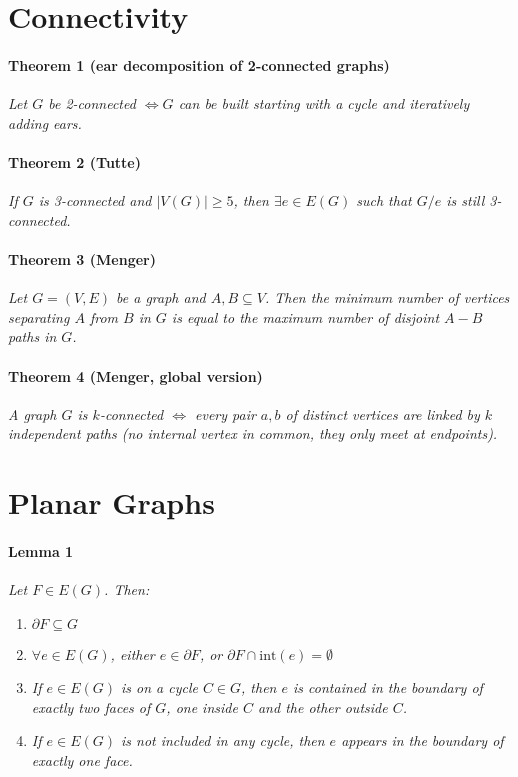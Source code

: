 \documentclass[a4paper,10pt]{article}
\begin{document}
\section{Connectivity}
\paragraph{Theorem 1 (ear decomposition of 2-connected graphs)}
\textit{Let $G$ be 2-connected $\iff G$ can be built starting with a cycle and iteratively adding ears.}

\paragraph{Theorem 2 (Tutte)} 
		\textit{If $G$ is 3-connected and $|V(G)| \geq 5$, then $\exists e \in E (G)$ such that $G / e$ is still 3-connected.}

\paragraph{Theorem 3 (Menger)}
		\textit{Let $G = (V,E)$ be a graph and $A, B \subseteq V$. Then the minimum number of vertices separating $A$ from $B$ in $G$ is equal to the maximum number of disjoint $A-B$ paths in $G$.}
		
\paragraph{Theorem 4 (Menger, global version)} \textit{A graph $G$ is $k$-connected $\iff$ every pair $a,b$ of distinct vertices are linked by $k$ independent paths (no internal vertex in common, they only meet at endpoints).}

\section{Planar Graphs}

\paragraph{Lemma 1}
\textit{Let $F \in E(G)$. Then:}
		\begin{enumerate}
			\item $\partial F \subseteq G$
			\item \textit{$\forall e \in E(G)$, either $e \in \partial F$, or $\partial F \cap \text{int}(e) = \emptyset$}
			\item \textit{If $e \in E(G)$ is on a cycle $C \in G$, then $e$ is contained in the boundary of exactly two faces of $G$, one inside $C$ and the other outside $C$.}
			\item \textit{If $e \in E(G)$ is not included in any cycle, then $e$ appears in the boundary of exactly one face.}
		\end{enumerate}
		
\end{document}

